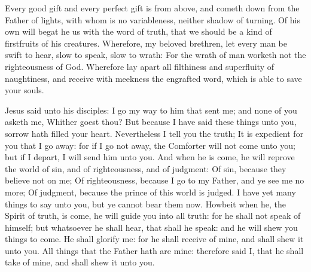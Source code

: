  Every good gift and every perfect gift is from above, and cometh down from the Father of lights, with whom is no variableness, neither shadow of turning. Of his own will begat he us with the word of truth, that we should be a kind of firstfruits of his creatures. Wherefore, my beloved brethren, let every man be swift to hear, slow to speak, slow to wrath: For the wrath of man worketh not the righteousness of God. Wherefore lay apart all filthiness and superfluity of naughtiness, and receive with meekness the engrafted word, which is able to save your souls.


 Jesus said unto his disciples: I go my way to him that sent me; and none of you asketh me, Whither goest thou? But because I have said these things unto you, sorrow hath filled your heart. Nevertheless I tell you the truth; It is expedient for you that I go away: for if I go not away, the Comforter will not come unto you; but if I depart, I will send him unto you. And when he is come, he will reprove the world of sin, and of righteousness, and of judgment: Of sin, because they believe not on me; Of righteousness, because I go to my Father, and ye see me no more; Of judgment, because the prince of this world is judged. I have yet many things to say unto you, but ye cannot bear them now. Howbeit when he, the Spirit of truth, is come, he will guide you into all truth: for he shall not speak of himself; but whatsoever he shall hear, that shall he speak: and he will shew you things to come. He shall glorify me: for he shall receive of mine, and shall shew it unto you. All things that the Father hath are mine: therefore said I, that he shall take of mine, and shall shew it unto you.

